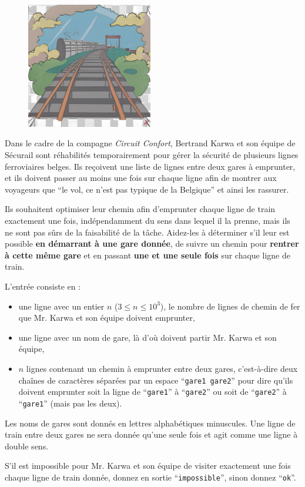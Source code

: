 \problemname{\problemyamlname}

\begin{figure}
    \centering
    \includegraphics[width=5.5cm]{railway.jpg}
\end{figure}
Dans le cadre de la compagne \emph{Circuit Confort}, Bertrand Karwa et son équipe de Sécurail sont réhabilités
temporairement pour gérer la sécurité de plusieurs lignes ferroviaires belges. Ils reçoivent une liste de lignes
entre deux gares à emprunter, et ils doivent passer au moins une fois sur chaque ligne afin de montrer aux
voyageurs que ``le vol, ce n'est pas typique de la Belgique'' et ainsi les rassurer.

Ils souhaitent optimiser leur chemin afin d'emprunter chaque ligne de train exactement une fois, indépendamment du sens dans lequel il la prenne, mais ils ne sont pas sûrs
de la faisabilité de la tâche. Aidez-les à déterminer s'il leur est possible \textbf{en démarrant à une gare donnée}, de suivre un chemin pour \textbf{rentrer à cette même gare} et en passant \textbf{une et une seule fois} sur chaque ligne de train.

\begin{Input}
    L'entrée consiste en :
    \begin{itemize}
        \item une ligne avec un entier $n$ ($3 \le n \le 10^3$), le nombre de lignes de chemin de fer que Mr. Karwa et son équipe doivent emprunter,
        \item une ligne avec un nom de gare, là d'où doivent partir Mr. Karwa et son équipe,
        \item $n$ lignes contenant un chemin à emprunter entre deux gares, c'est-à-dire deux chaînes de caractères séparées par un espace ``\verb|gare1 gare2|'' pour dire qu'ils doivent emprunter soit la ligne de ``\verb|gare1|'' à ``\verb|gare2|'' ou soit de ``\verb|gare2|'' à ``\verb|gare1|'' (mais pas les deux).
    \end{itemize}
    Les noms de gares sont donnés en lettres alphabétiques minuscules.
    Une ligne de train entre deux gares ne sera donnée qu'une seule fois et agit comme une ligne à double sens.
\end{Input}

\begin{Output}
    S'il est impossible pour Mr. Karwa et son équipe de visiter exactement une fois chaque ligne de train donnée, donnez en sortie ``\verb|impossible|'', sinon donnez ``\verb|ok|''.
\end{Output}
